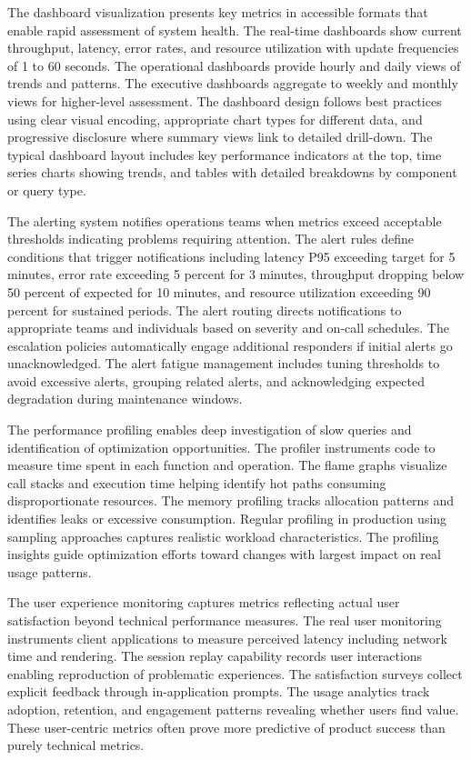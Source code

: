 The dashboard visualization presents key metrics in accessible formats that enable rapid assessment of system health. The real-time dashboards show current throughput, latency, error rates, and resource utilization with update frequencies of 1 to 60 seconds. The operational dashboards provide hourly and daily views of trends and patterns. The executive dashboards aggregate to weekly and monthly views for higher-level assessment. The dashboard design follows best practices using clear visual encoding, appropriate chart types for different data, and progressive disclosure where summary views link to detailed drill-down. The typical dashboard layout includes key performance indicators at the top, time series charts showing trends, and tables with detailed breakdowns by component or query type.

The alerting system notifies operations teams when metrics exceed acceptable thresholds indicating problems requiring attention. The alert rules define conditions that trigger notifications including latency P95 exceeding target for 5 minutes, error rate exceeding 5 percent for 3 minutes, throughput dropping below 50 percent of expected for 10 minutes, and resource utilization exceeding 90 percent for sustained periods. The alert routing directs notifications to appropriate teams and individuals based on severity and on-call schedules. The escalation policies automatically engage additional responders if initial alerts go unacknowledged. The alert fatigue management includes tuning thresholds to avoid excessive alerts, grouping related alerts, and acknowledging expected degradation during maintenance windows.

The performance profiling enables deep investigation of slow queries and identification of optimization opportunities. The profiler instruments code to measure time spent in each function and operation. The flame graphs visualize call stacks and execution time helping identify hot paths consuming disproportionate resources. The memory profiling tracks allocation patterns and identifies leaks or excessive consumption. Regular profiling in production using sampling approaches captures realistic workload characteristics. The profiling insights guide optimization efforts toward changes with largest impact on real usage patterns.

The user experience monitoring captures metrics reflecting actual user satisfaction beyond technical performance measures. The real user monitoring instruments client applications to measure perceived latency including network time and rendering. The session replay capability records user interactions enabling reproduction of problematic experiences. The satisfaction surveys collect explicit feedback through in-application prompts. The usage analytics track adoption, retention, and engagement patterns revealing whether users find value. These user-centric metrics often prove more predictive of product success than purely technical metrics.


